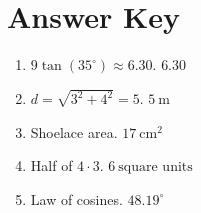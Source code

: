 \documentclass[12pt]{article}
\begin{document}
\section*{Answer Key}
\begin{enumerate}
  \item $9\tan(35^\circ) \approx 6.30$. \quad $\boxed{6.30}$
  \item $d = \sqrt{3^2 + 4^2} = 5$. \quad $\boxed{5\ \text{m}}$
  \item Shoelace area. \quad $\boxed{17\ \text{cm}^2}$
  \item Half of $4 \cdot 3$. \quad $\boxed{6\ \text{square units}}$
  \item Law of cosines. \quad $\boxed{48.19^\circ}$
\end{enumerate}
\end{document}
